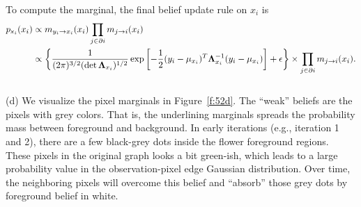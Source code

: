 \documentclass{article}
\newcommand{\s}[1]{\textsf{\textit{#1}}}
\begin{document}
To compute the marginal, the final belief update rule on $x_i$ is
\begin{align*}
	p_{\s{x}_i}(x_i) &\propto  m_{y_i\to x_i}(x_i) \prod_{j\in\partial{i}}m_{j\to i}(x_i)\\
	&\propto \left\{\frac{1}{(2\pi)^{3/2}(\det {\bf\Lambda}_{x_i})^{1/2}} \exp\left[-\frac{1}{2}(y_i-\mu_{x_i})^T\mathbf{\Lambda}^{-1}_{x_i}(y_i - \mu_{x_i})\right] + \epsilon\right\}
	\times \prod_{j\in\partial{i}}m_{j\to i}(x_i).
\end{align*}
\\

\noindent
(d) We visualize the pixel marginals in Figure~\ref{f:52d}.
%
The ``weak'' beliefs are the pixels with grey colors. That is, the underlining
marginals spreads the probability mass between foreground and background.
%
In early iterations (e.g., iteration 1 and 2), there are a few black-grey dots inside
the flower foreground regions. These pixels in the original graph looks a bit green-ish,
which leads to a large probability value in the observation-pixel edge Gaussian
distribution. Over time, the neighboring pixels will overcome this belief and ``absorb''
those grey dots by foreground belief in white.
%
\end{document}
